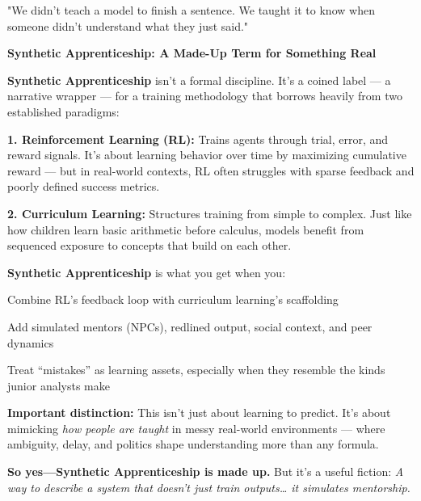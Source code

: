 "We didn’t teach a model to finish a sentence.
We taught it to know when someone didn’t understand what they just said."

\medskip

\begin{TechnicalSidebar}{\textbf{Synthetic Apprenticeship: A Made-Up Term for Something Real}}

    \textbf{Synthetic Apprenticeship} isn’t a formal discipline. It’s a coined label — a narrative wrapper — for a training methodology that borrows heavily from two established paradigms:
    
    \vspace{0.5em}
    \textbf{1. Reinforcement Learning (RL):}
    Trains agents through trial, error, and reward signals. It’s about learning behavior over time by maximizing cumulative reward — but in real-world contexts, RL often struggles with sparse feedback and poorly defined success metrics.
    
    \vspace{0.5em}
    \textbf{2. Curriculum Learning:}
    Structures training from simple to complex. Just like how children learn basic arithmetic before calculus, models benefit from sequenced exposure to concepts that build on each other.
    
    \vspace{1em}
    \textbf{Synthetic Apprenticeship} is what you get when you:
    
    Combine RL’s feedback loop with curriculum learning’s scaffolding
    
    Add simulated mentors (NPCs), redlined output, social context, and peer dynamics
    
    Treat “mistakes” as learning assets, especially when they resemble the kinds junior analysts make
    
    \vspace{0.5em}
    \textbf{Important distinction:}
    This isn’t just about learning to predict. It’s about mimicking \textit{how people are taught} in messy real-world environments — where ambiguity, delay, and politics shape understanding more than any formula.
    
    \vspace{0.5em}
    \textbf{So yes—Synthetic Apprenticeship is made up.}
    But it’s a useful fiction:
    \textit{A way to describe a system that doesn’t just train outputs… it simulates mentorship.}
    
    \end{TechnicalSidebar}

